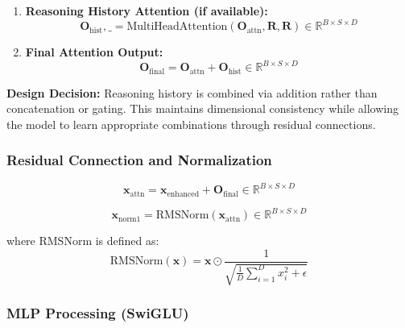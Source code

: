 \documentclass{article}
\begin{document}
\begin{enumerate}
\item \textbf{Reasoning History Attention (if available):}
\begin{equation}
\mathbf{O}_{\text{hist}}, \_ = \text{MultiHeadAttention}(\mathbf{O}_{\text{attn}}, \mathbf{R}, \mathbf{R}) \in \mathbb{R}^{B \times S \times D}
\end{equation}

\item \textbf{Final Attention Output:}
\begin{equation}
\mathbf{O}_{\text{final}} = \mathbf{O}_{\text{attn}} + \mathbf{O}_{\text{hist}} \in \mathbb{R}^{B \times S \times D}
\end{equation}
\end{enumerate}

\textbf{Design Decision:} Reasoning history is combined via addition rather than concatenation or gating. This maintains dimensional consistency while allowing the model to learn appropriate combinations through residual connections.

\subsubsection{Residual Connection and Normalization}

\begin{equation}
\mathbf{x}_{\text{attn}} = \mathbf{x}_{\text{enhanced}} + \mathbf{O}_{\text{final}} \in \mathbb{R}^{B \times S \times D}
\end{equation}

\begin{equation}
\mathbf{x}_{\text{norm1}} = \text{RMSNorm}(\mathbf{x}_{\text{attn}}) \in \mathbb{R}^{B \times S \times D}
\end{equation}

where RMSNorm is defined as:
\begin{equation}
\text{RMSNorm}(\mathbf{x}) = \mathbf{x} \odot \frac{1}{\sqrt{\frac{1}{D}\sum_{i=1}^{D} x_i^2 + \epsilon}}
\end{equation}

\subsubsection{MLP Processing (SwiGLU)}
\end{document}
